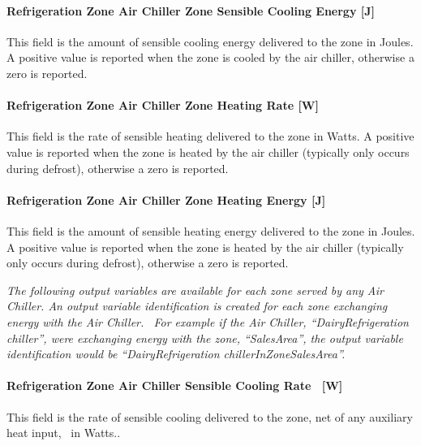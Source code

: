 \paragraph{Refrigeration Zone Air Chiller Zone Sensible Cooling Energy {[}J{]}}\label{refrigeration-zone-air-chiller-zone-sensible-cooling-energy-j}

This field is the amount of sensible cooling energy delivered to the zone in Joules. A positive value is reported when the zone is cooled by the air chiller, otherwise a zero is reported.

\paragraph{Refrigeration Zone Air Chiller Zone Heating Rate {[}W{]}}\label{refrigeration-zone-air-chiller-zone-heating-rate-w}

This field is the rate of sensible heating delivered to the zone in Watts. A positive value is reported when the zone is heated by the air chiller (typically only occurs during defrost), otherwise a zero is reported.

\paragraph{Refrigeration Zone Air Chiller Zone Heating Energy {[}J{]}}\label{refrigeration-zone-air-chiller-zone-heating-energy-j}

This field is the amount of sensible heating energy delivered to the zone in Joules. A positive value is reported when the zone is heated by the air chiller (typically only occurs during defrost), otherwise a zero is reported.

\emph{The following output variables are available for each zone served by any Air Chiller. An output variable identification is created for each zone exchanging energy with the Air Chiller.~ For example if the Air Chiller, ``DairyRefrigeration chiller'', were exchanging energy with the zone, ``SalesArea'', the output variable identification would be ``DairyRefrigeration chillerInZoneSalesArea''.}

\paragraph{Refrigeration Zone Air Chiller Sensible Cooling Rate~ {[}W{]}}\label{refrigeration-zone-air-chiller-sensible-cooling-rate-w-2}

This field is the rate of sensible cooling delivered to the zone, net of any auxiliary heat input,~ in Watts..

